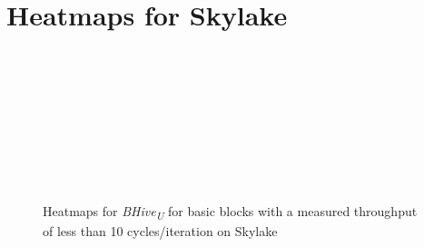 \documentclass[sigconf,nonacm]{acmart}
\newcommand{\bhiveu}{\emph{BHive\textsubscript{U}}\xspace}
\begin{document}
\section{Heatmaps for Skylake}
\vfill
\begin{figure}[H]
\centering
\begin{subfigure}[t]{0.33\textwidth}\end{subfigure}~
\begin{subfigure}[t]{0.33\textwidth}\end{subfigure}~
\begin{subfigure}[t]{0.33\textwidth}\end{subfigure}\par\bigskip

\begin{subfigure}[t]{0.33\textwidth}\end{subfigure}~
\begin{subfigure}[t]{0.33\textwidth}\end{subfigure}~
\begin{subfigure}[t]{0.33\textwidth}\end{subfigure}\par\bigskip

\begin{subfigure}[t]{0.33\textwidth}\end{subfigure}~
\begin{subfigure}[t]{0.33\textwidth}\end{subfigure}
\caption{Heatmaps for \bhiveu for basic blocks with a measured throughput of less than 10 cycles/iteration on Skylake}
\end{figure}
\vfill
\end{document}
